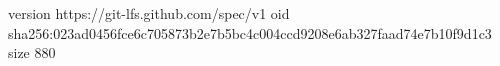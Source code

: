 version https://git-lfs.github.com/spec/v1
oid sha256:023ad0456fce6c705873b2e7b5bc4c004ccd9208e6ab327faad74e7b10f9d1c3
size 880
